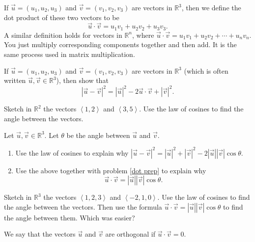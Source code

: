 \begin{definition}
If $\vec u = (u_1,u_2,u_3)$ and $\vec v= (v_1,v_2,v_3)$ are vectors in $\mathbb{R}^3$, then we define the dot product of these two vectors to be 
$$\vec u\cdot \vec v = u_1 v_1+ u_2 v_2+ u_3 v_3.$$
A similar definition holds for vectors in $\mathbb{R}^n$, where
$\vec u\cdot \vec v = u_1 v_1+ u_2 v_2+\cdots+ u_n v_n.$
You just multiply corresponding components together and then add. It is the same process used in matrix multiplication.
\end{definition}

\begin{problem}\label{dot prep} 
If $\vec u = (u_1,u_2,u_3)$ and $\vec v= (v_1,v_2,v_3)$ are vectors in $\mathbb{R}^3$ (which is often written $\vec u,\vec v\in\mathbb{R}^3$), then show that 
$$|\vec u-\vec v|^2 = |\vec u|^2-2\vec u\cdot \vec v +|\vec v|^2.$$
\end{problem}

\begin{problem} 
Sketch in $\mathbb{R}^2$ the vectors $\left<1,2\right>$ and $\left<3,5\right>$.  Use the law of cosines to find the angle between the vectors.
\end{problem}


\begin{problem}  
Let $\vec u,\vec v\in\mathbb{R}^3$. Let $\theta$ be the angle between $\vec u$ and $\vec v$. 
\begin{enumerate}
\item Use the law of cosines to explain why $|\vec u-\vec v|^2=|\vec u|^2+|\vec v|^2-2|\vec u||\vec v|\cos\theta$.
\item Use the above together with problem \ref{dot prep} to explain why $$\vec u\cdot \vec v=|\vec u||\vec v|\cos\theta.$$
\end{enumerate}
\end{problem}

\begin{problem}  
Sketch in $\mathbb{R}^3$ the vectors $\left<1,2,3\right>$ and $\left<-2,1,0\right>$.  Use the law of cosines to find the angle between the vectors. Then use the formula $\vec u\cdot \vec v=|\vec u||\vec v|\cos\theta$ to find the angle between them. Which was easier?
\end{problem}

\begin{definition}
We say that the vectors $\vec u$ and $\vec v$ are orthogonal if $\vec u\cdot \vec v=0$. 
\end{definition}

